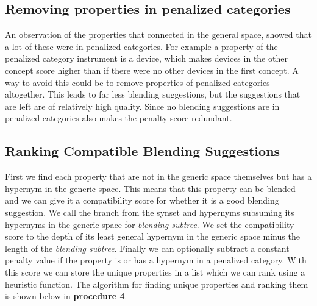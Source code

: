 \subsection{Removing properties in penalized categories}
An observation of the properties that connected in the general space, showed that a lot of these were in penalized categories. For example a property of the penalized category instrument is a device, which makes devices in the other concept score higher than if there were no other devices in the first concept. A way to avoid this could be to remove properties of penalized categories altogether. This leads to far less blending suggestions, but the suggestions that are left are of relatively high quality. Since no blending suggestions are in penalized categories also makes the penalty score redundant.

\subsection{Ranking Compatible Blending Suggestions}
First we find each property that are not in the generic space themselves but has a hypernym in the generic space. This means that this property can be blended and we can give it a compatibility score for whether it is a good blending suggestion. We call the branch from the synset and hypernyms subsuming its hypernyms in the generic space for \emph{blending subtree}. We set the compatibility score to the depth of its least general hypernym in the generic space minus the length of the \emph{blending subtree}. Finally we can optionally subtract a constant penalty value if the property is or has a hypernym in a penalized category. With this score we can store the unique properties in a list which we can rank using a heuristic function. The algorithm for finding unique properties and ranking them is shown below in \textbf{procedure 4}.

